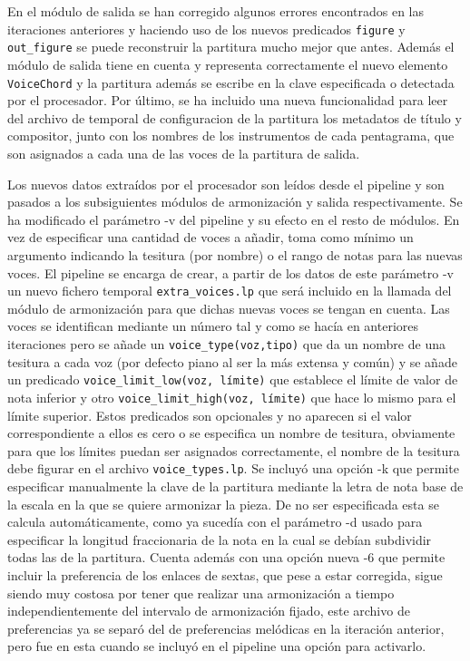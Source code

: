En el módulo de salida se han corregido algunos errores encontrados en las iteraciones anteriores y haciendo uso de los nuevos predicados \texttt{figure} y \texttt{out\_figure} se puede reconstruir la partitura mucho mejor que antes. Además el módulo de salida tiene en cuenta y representa correctamente el nuevo elemento \texttt{VoiceChord} y la partitura además se escribe en la clave especificada o detectada por el procesador. Por último, se ha incluido una nueva funcionalidad para leer del archivo de temporal de configuracion de la partitura los metadatos de título y compositor, junto con los nombres de los instrumentos de cada pentagrama, que son asignados a cada una de las voces de la partitura de salida.

Los nuevos datos extraídos por el procesador son leídos desde el pipeline y son pasados a los subsiguientes módulos de armonización y salida respectivamente. Se ha modificado el parámetro -v del pipeline y su efecto en el resto de módulos. En vez de especificar una cantidad de voces a añadir, toma como mínimo un argumento indicando la tesitura (por nombre) o el rango de notas para las nuevas voces. El pipeline se encarga de crear, a partir de los datos de este parámetro -v un nuevo fichero temporal \texttt{extra\_voices.lp} que será incluido en la llamada del módulo de armonización para que dichas nuevas voces se tengan en cuenta. Las voces se identifican mediante un número tal y como se hacía en anteriores iteraciones pero se añade un \texttt{voice\_type(voz,tipo)} que da un nombre de una tesitura a cada voz (por defecto piano al ser la más extensa y común) y se añade un predicado \texttt{voice\_limit\_low(voz, límite)} que establece el límite de valor de nota inferior y otro \texttt{voice\_limit\_high(voz, límite)} que hace lo mismo para el límite superior. Estos predicados son opcionales y no aparecen si el valor correspondiente a ellos es cero o se especifica un nombre de tesitura, obviamente para que los límites puedan ser asignados correctamente, el nombre de la tesitura debe figurar en el archivo \texttt{voice\_types.lp}. Se incluyó una opción -k que permite especificar manualmente la clave de la partitura mediante la letra de nota base de la escala en la que se quiere armonizar la pieza. De no ser especificada esta se calcula automáticamente, como ya sucedía con el parámetro -d usado para especificar la longitud fraccionaria de la nota en la cual se debían subdividir todas las de la partitura. Cuenta además con una opción nueva -6 que permite incluir la preferencia de los enlaces de sextas, que pese a estar corregida, sigue siendo muy costosa por tener que realizar una armonización a tiempo independientemente del intervalo de armonización fijado, este archivo de preferencias ya se separó del de preferencias melódicas en la iteración anterior, pero fue en esta cuando se incluyó en el pipeline una opción para activarlo.

